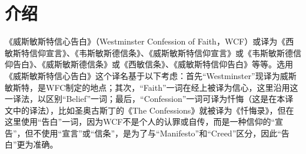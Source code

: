 \documentclass[12pt, a4paper, oneside]{ctexart}
\begin{document}
\begin{abstract}
	这是本人归信基督后开展的第一项工作。这个工作不是我的“本职”工作。我所学并非神学，也非从事专业翻译工作。但作为理工专业出身，我更明白我所学所受皆源自祂。而本人也刚开始领受上帝的话语，对圣经研读知之甚少。正因如此，我明白自己是灵里贫困的人，而无比渴望得到上帝的言，急切需要祂的话语来荡涤我这罪人的心。何况我从祂那领受了一颗无伪的真心，这让我有无可辩驳与推卸的责任，要将的祂的话由这颗心倾吐出来，以作为对祂的见证。

	本人翻译《威斯敏斯特信心告白》一方面希望从中获得对上帝、对信仰更深的认识，另一方面希望通过翻译将上帝的旨意更准确地传递出来。\href{https://www.bible.world/%E5%A8%81%E6%96%AF%E6%95%8F%E6%96%AF%E7%89%B9%E4%BF%A1%E6%9D%A1}{《威斯敏斯特信心告白》}已有多个汉译版本，但他们的翻译更倾向于意译，而原文诸多意思在译文中并未完全反映，或有所偏差。而这一问题在中译《圣经》中同样存在。为此，在翻译中我采用直译的方法，而且不仅对《威斯敏斯特信心告白》进行翻译，也对注解引到的经文进行翻译。限于本人能力，经文暂按英文译本进行翻译，力图呈现原意，以使得《威斯敏斯特信心告白》翻译更完整，而自成一体。
	
	翻译本身也是一个系统工程，需要不断地迭代不断纠错，才能向祂的真理不断靠近。我将此工作在网上开源，期盼同工一起使此译本能得到不断完善。这项工作也仅仅是一个开始，一个基础，为后续体系的翻译做好准备和铺垫。自己的工作只是属世的职业，而为祂工作才是永永远远。
	
	我这样的罪人能得蒙主的救赎，无论怎么做，做多少都亏欠于祂。而万一此工作有幸有人看到并认识主，跟从主，归向主，这也是对亏欠莫大的安慰。当然这一切都仰仗主亲自的教导与带领，没有主的同在，我什么也不是，更是什么都做不了。求主宽恕我这个罪人，带领真心跟从祢的仆人，使他心中所想，手中所写能合乎祢的心意，愿祢的意志在地如在天！阿们。
	
	\hfill Job Zhao

	\hfill 2023年12月24日
    
\end{abstract}

\newpage
{}
\setcounter{page}{1}
\tableofcontents
\newpage
\setcounter{page}{1}

\section*{介绍}

《威斯敏斯特信心告白》（Westminster Confession of Faith，WCF）或译为《西敏斯特信仰宣言》、《韦斯敏斯德信条》、《威斯敏斯特信仰宣言》或《韦斯敏斯德信仰告白》、《威斯敏斯德信条》或《西敏信条》、《威敏斯特信仰告白》等等。选用《威斯敏斯特信心告白》这个译名基于以下考虑：首先“Westminster”现译为威斯敏斯特，是WFC制定的地点；其次，“Faith”一词在经上被译为信心，这里沿用这一译法，以区别“Belief”一词；最后，“Confession”一词可译为忏悔（这是在本译文中的译法），比如圣奥古斯丁的《The Confessions》就被译为《忏悔录》，但在这里使用“告白”一词，因为WCF不是个人的认罪或自传，而是一种信仰的“宣告”，但不使用“宣言”或“信条”，是为了与“Manifesto”和“Creed”区分，因此“告白”更为准确。
\end{document}
